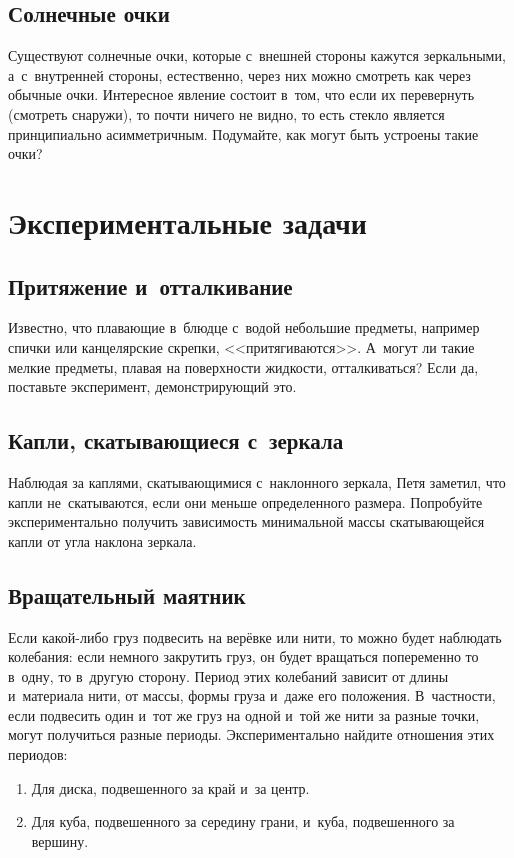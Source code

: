 \documentclass[a4paper,12pt]{article}
\begin{document}
\subsection{Солнечные очки}
Существуют солнечные очки, которые с~внешней стороны кажутся зеркальными, а~с~внутренней стороны,
естественно, через них можно смотреть как через обычные очки. Интересное явление состоит в~том,
что если их перевернуть (смотреть снаружи), то почти ничего не видно, то есть стекло является
принципиально асимметричным. Подумайте, как могут быть устроены такие очки?

\section{Экспериментальные задачи}

\subsection{Притяжение и~отталкивание}

Известно, что плавающие в~блюдце с~водой небольшие предметы, например спички или канцелярские скрепки,
<<притягиваются>>. А~могут ли такие мелкие предметы, плавая на поверхности жидкости,
отталкиваться? Если да, поставьте эксперимент, демонстрирующий это.

\subsection{Капли, скатывающиеся с~зеркала}
Наблюдая за каплями, скатывающимися с~наклонного зеркала, Петя заметил, что капли не~скатываются,
если они меньше определенного размера. Попробуйте экспериментально получить зависимость минимальной
массы скатывающейся капли от угла наклона зеркала.

\subsection{Вращательный маятник}
Если какой-либо груз подвесить на верёвке или нити, то можно будет наблюдать колебания:
если немного закрутить груз, он будет вращаться попеременно то в~одну, то в~другую сторону.
Период этих колебаний зависит от длины и~материала нити, от массы, формы груза и~даже его положения.
В~частности, если подвесить один и~тот же груз на одной и~той же нити за разные точки, могут
получиться разные периоды. Экспериментально найдите отношения этих периодов:
\begin{enumerate}
\item Для диска, подвешенного за край и~за центр.
\item Для куба, подвешенного за середину грани, и~куба, подвешенного за вершину.
\end{enumerate}
\end{document}
